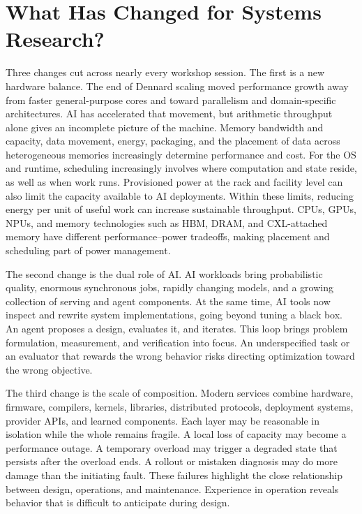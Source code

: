 \documentclass[manuscript]{acmart}
\begin{document}
\section{What Has Changed for Systems Research?}

Three changes cut across nearly every workshop session.
The first is a new hardware balance.
The end of Dennard scaling moved performance growth away from faster general-purpose cores and
toward parallelism and domain-specific architectures.
AI has accelerated that movement, but arithmetic throughput alone gives an incomplete picture of the machine.
Memory bandwidth and capacity, data movement, energy, packaging,
and the placement of data across heterogeneous memories increasingly determine performance and cost.
For the OS and runtime, scheduling increasingly involves where computation and state reside, as well as when work runs.
Provisioned power at the rack and facility level can also limit the capacity available to AI deployments.
Within these limits, reducing energy per unit of useful work can increase sustainable throughput.
CPUs, GPUs, NPUs, and memory technologies such as HBM, DRAM, and CXL-attached memory have different performance--power tradeoffs, making placement and scheduling part of power management.

The second change is the dual role of AI.
AI workloads bring probabilistic quality, enormous synchronous jobs, rapidly changing models,
and a growing collection of serving and agent components.
At the same time, AI tools now inspect and rewrite system implementations, going beyond tuning a black box.
An agent proposes a design, evaluates it, and iterates.
This loop brings problem formulation, measurement, and verification into focus.
An underspecified task or an evaluator that rewards the wrong behavior risks directing optimization toward the wrong objective.

The third change is the scale of composition.
Modern services combine hardware, firmware, compilers, kernels, libraries, distributed protocols,
deployment systems, provider APIs, and learned components.
Each layer may be reasonable in isolation while the whole remains fragile.
A local loss of capacity may become a performance outage.
A temporary overload may trigger a degraded state that persists after the overload ends.
A rollout or mistaken diagnosis may do more damage than the initiating fault.
These failures highlight the close relationship between design, operations, and maintenance.
Experience in operation reveals behavior that is difficult to anticipate during design.
\end{document}
